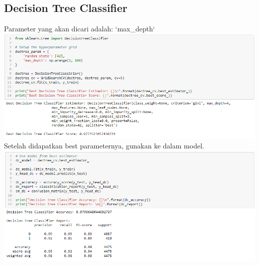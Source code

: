 \documentclass[12pt]{article}
\begin{document}
    \subsection{Decision Tree Classifier}
    \newline
    \newline Parameter yang akan dicari adalah: `max\_depth`
    \newline \includegraphics[scale=0.535]{dctree-tune.png}
    \newline
    \newline Setelah didapatkan best parameternya, gunakan ke dalam model.
    \newline \includegraphics[scale=0.535]{dctree-model.png}
    
    \newpage
    
\end{document}
